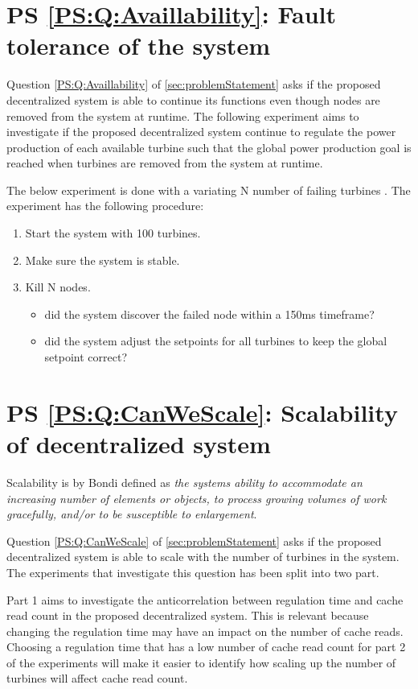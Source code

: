 \section{PS \ref{PS:Q:Availlability}: Fault tolerance of the system}
Question \ref{PS:Q:Availlability} of \cref{sec:problemStatement} asks if the proposed decentralized system is able to continue its functions even though nodes are removed from the system at runtime. The following experiment aims to investigate if the proposed decentralized system continue to regulate the power production of each available turbine such that the global power production goal is reached when turbines are removed from the system at runtime. 

The below experiment is done with a variating N number of failing turbines \failingTurbineNumbers.
The experiment has the following procedure:
\begin{enumerate}
	\item Start the system with 100 turbines.
	\item Make sure the system is stable.
	\item Kill N nodes.
	\begin{itemize}
		\item did the system discover the failed node within a 150ms timeframe?
		\item did the system adjust the setpoints for all turbines to keep the global setpoint correct?
	\end{itemize}
\end{enumerate}


\section{PS \ref{PS:Q:CanWeScale}: Scalability of decentralized system}
Scalability is by Bondi\cite{Bondi:2000:CSI:350391.350432} defined as \textit{the systems ability to accommodate an increasing number of elements or objects, to process growing volumes of work gracefully, and/or to be susceptible to enlargement}.

Question \ref{PS:Q:CanWeScale} of \cref{sec:problemStatement} asks if the proposed decentralized system is able to scale with the number of turbines in the system. The experiments that investigate this question has been split into two part.  \newline

Part 1 aims to investigate the anticorrelation between regulation time and cache read count in the proposed decentralized system. This is relevant because changing the regulation time may have an impact on the number of cache reads. Choosing a regulation time that has a low number of cache read count for part 2 of the experiments will make it easier to identify how scaling up the number of turbines will affect cache read count. \newline

